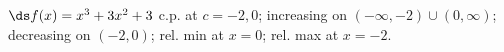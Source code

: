 {$\ds f(x) =x^3+3x^2+3$
}
{c.p. at $c=-2,0$; 
increasing on $(-\infty,-2)\cup (0,\infty)$;
decreasing on $(-2,0)$;
rel. min at $x=0$;
rel. max at $x=-2$.
}
